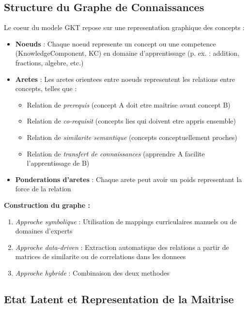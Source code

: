 \documentclass[11pt, a4paper]{article}
\begin{document}
\subsection{Structure du Graphe de Connaissances}

Le coeur du modele GKT repose sur une representation graphique des concepts :

\begin{itemize}
    \item \textbf{Noeuds} : Chaque noeud represente un concept ou une competence (KnowledgeComponent, KC) en domaine d'apprentissage (p. ex. : addition, fractions, algebre, etc.)

    \item \textbf{Aretes} : Les aretes orientees entre noeuds representent les relations entre concepts, telles que :
          \begin{itemize}
              \item Relation de \emph{prerequis} (concept A doit etre maitrise avant concept B)
              \item Relation de \emph{co-requisit} (concepts lies qui doivent etre appris ensemble)
              \item Relation de \emph{similarite semantique} (concepts conceptuellement proches)
              \item Relation de \emph{transfert de connaissances} (apprendre A facilite l'apprentissage de B)
          \end{itemize}

    \item \textbf{Ponderations d'aretes} : Chaque arete peut avoir un poids representant la force de la relation
\end{itemize}

\textbf{Construction du graphe :}
\begin{enumerate}
    \item \emph{Approche symbolique} : Utilisation de mappings curriculaires manuels ou de domaines d'experts
    \item \emph{Approche data-driven} : Extraction automatique des relations a partir de matrices de similarite ou de correlations dans les donnees
    \item \emph{Approche hybride} : Combinaison des deux methodes
\end{enumerate}

\subsection{Etat Latent et Representation de la Maitrise}
\end{document}
